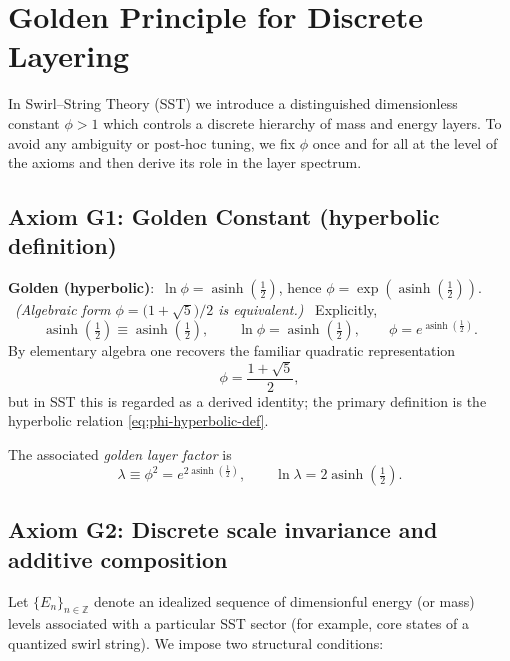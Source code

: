 \documentclass[10pt,reprint,aps,onecolumn,nofootinbib]{revtex4-2}
\newcommand{\xig}{\operatorname{asinh}\!\left(\tfrac{1}{2}\right)}
\newcommand{\phig}{\exp(\xig)}
\newcommand{\phialg}{\bigl(1+\sqrt{5}\bigr)/2}
\newcommand{\GoldenDeclare}{%
    \textbf{Golden (hyperbolic)}:\ \(\ln\phi=\xig\), hence \(\phi=\phig\).
    \ \emph{(Algebraic form \(\phi=\phialg\) is equivalent.)}%
}
\begin{document}
    \section{Golden Principle for Discrete Layering}
    \label{sec:golden-principle}

    In Swirl--String Theory (SST) we introduce a distinguished
    dimensionless constant $\phi>1$ which controls a discrete hierarchy of
    mass and energy layers. To avoid any ambiguity or post-hoc tuning, we
    fix $\phi$ once and for all at the level of the axioms and then derive
    its role in the layer spectrum.

    \subsection{Axiom G1: Golden Constant (hyperbolic definition)}

        \GoldenDeclare\ Explicitly,
        \begin{equation}
            \xig \equiv \operatorname{asinh}\!\left(\tfrac{1}{2}\right),
            \qquad
            \ln\phi = \xig,
            \qquad
            \phi = e^{\xig}.
            \label{eq:phi-hyperbolic-def}
        \end{equation}
        By elementary algebra one recovers the familiar quadratic representation
        \begin{equation}
            \phi = \frac{1+\sqrt{5}}{2},
        \end{equation}
        but in SST this is regarded as a derived identity; the primary
        definition is the hyperbolic relation \eqref{eq:phi-hyperbolic-def}.

        The associated \emph{golden layer factor} is
        \begin{equation}
            \lambda \equiv \phi^{2} = e^{2\xig},
            \qquad
            \ln\lambda = 2\xig.
            \label{eq:lambda-def}
        \end{equation}

    \subsection{Axiom G2: Discrete scale invariance and additive composition}

        Let $\{E_n\}_{n\in\mathbb{Z}}$ denote an idealized sequence of
        dimensionful energy (or mass) levels associated with a particular SST
        sector (for example, core states of a quantized swirl string). We
        impose two structural conditions:
\end{document}
